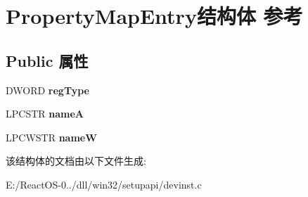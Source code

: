 \hypertarget{struct_property_map_entry}{}\section{Property\+Map\+Entry结构体 参考}
\label{struct_property_map_entry}
\subsection*{Public 属性}
\begin{DoxyCompactItemize}
\item 
\mbox{\label{struct_property_map_entry_a9245eed0128b830a44c4dd93247e3250}} 
D\+W\+O\+RD {\bfseries reg\+Type}
\item 
\mbox{\label{struct_property_map_entry_aba8ec63ba7a00d7a4883d8243fbaa8ed}} 
L\+P\+C\+S\+TR {\bfseries nameA}
\item 
\mbox{\label{struct_property_map_entry_ab59b6b34c5391e0c044dca94c7e05cdd}} 
L\+P\+C\+W\+S\+TR {\bfseries nameW}
\end{DoxyCompactItemize}


该结构体的文档由以下文件生成\+:\begin{DoxyCompactItemize}
\item 
E\+:/\+React\+O\+S-\/0../dll/win32/setupapi/devinst.\+c\end{DoxyCompactItemize}
